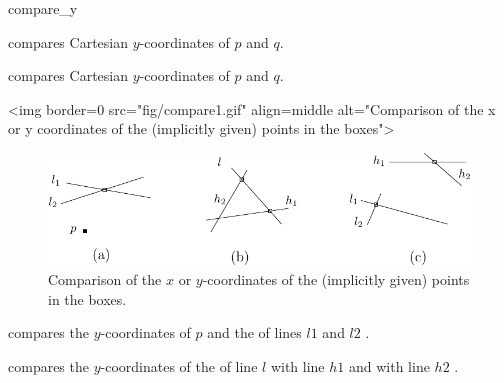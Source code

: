 \begin{ccRefFunction}{compare_y}

        {compares Cartesian $y$-coordinates of $p$ and $q$.}

        {compares Cartesian $y$-coordinates of $p$ and $q$.}

\begin{ccHtmlOnly}
<img border=0 src="fig/compare1.gif" align=middle alt="Comparison of the x 
or y coordinates of the (implicitly given) points in the boxes">
\end{ccHtmlOnly} 

\begin{ccTexOnly}
\begin{figure}[hb]
\centerline{\includegraphics{Kernel_23_ref/fig/compare1}}
\caption{Comparison of the $x$ or $y$-coordinates of the (implicitly
given) points in the boxes.\label{fig-compare13}}
\end{figure} 
\end{ccTexOnly} 

        {compares the $y$-coordinates of $p$ and the  of lines
         $l1$ and $l2$%
         .}


        {compares the $y$-coordinates of the  of line $l$
         with line $h1$ and with line $h2$%
         .}



\end{ccRefFunction}
